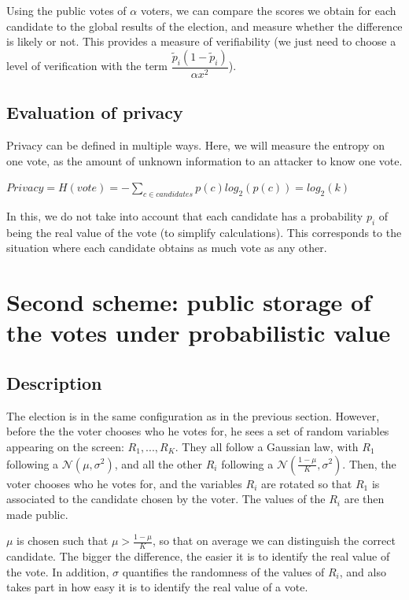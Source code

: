 \documentclass{article}
\begin{document}
Using the public votes of $\alpha$ voters, we can compare the scores we obtain for each candidate to the global results of the election, and measure whether the difference is likely or not. This provides a measure of verifiability (we just need to choose a level of verification with the term $\dfrac{\tilde{p}_i(1-\tilde{p}_i)}{\alpha x^2}$).


\subsection{Evaluation of privacy}

Privacy can be defined in multiple ways. Here, we will measure the entropy on one vote, as the amount of unknown information to an attacker to know one vote.

$Privacy=H(vote)=-\sum\limits_{c \in candidates} p(c)log_2(p(c))=log_2(k)$

In this, we do not take into account that each candidate has a probability $p_i$ of being the real value of the vote (to simplify calculations). This corresponds to the situation where each candidate obtains as much vote as any other.


\section{Second scheme: public storage of the votes under probabilistic value}


\subsection{Description}

The election is in the same configuration as in the previous section. However, before the the voter chooses who he votes for, he sees a set of random variables appearing on the screen: $R_1, ..., R_K$. They all follow a Gaussian law, with $R_1$ following a $\mathcal{N}(\mu, \sigma^2)$, and all the other $R_i$ following a $\mathcal{N}(\frac{1-\mu}{K}, \sigma^2)$. Then, the voter chooses who he votes for, and the variables $R_i$ are rotated so that $R_1$ is associated to the candidate chosen by the voter. The values of the $R_i$ are then made public. 

$\mu$ is chosen such that $\mu > \frac{1-\mu}{K}$, so that on average we can distinguish the correct candidate. The bigger the difference, the easier it is to identify the real value of the vote. In addition, $\sigma$ quantifies the randomness of the values of $R_i$, and also takes part in how easy it is to identify the real value of a vote.
\end{document}
